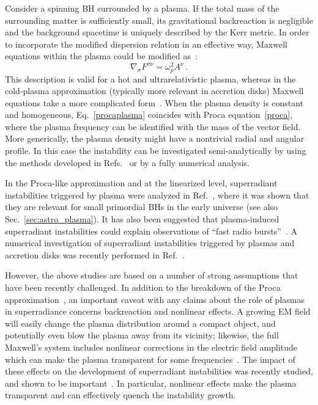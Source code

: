 \documentclass[11pt]{article}
\numberwithin{equation}{section} %
\begin{document}
Consider a spinning BH surrounded by a plasma. If the total mass of the surrounding matter is sufficiently small, its 
gravitational backreaction is negligible and the background spacetime is uniquely described by the Kerr metric.
In order to incorporate the modified dispersion relation in an effective way, Maxwell equations within the plasma could be modified as~\cite{Kulsrud:1991jt}:
\begin{equation}
\nabla_\sigma F^{\sigma\nu}=\omega_p^2 A^\nu\,.\label{procaplasma}
\end{equation}
This description is valid for a hot and ultrarelativistic plasma, whereas in the cold-plasma approximation (typically more relevant in accretion disks) Maxwell equations take a more complicated form~\cite{Cannizzaro:2020uap}.
%
When the plasma density is constant and homogeneous, Eq.~\eqref{procaplasma} coincides with Proca equation~\eqref{proca}, where the plasma frequency can be identified with the mass of the vector field. More generically, the plasma density might have a nontrivial radial and angular profile. In this case the instability can be investigated semi-analytically by using the methods developed in Refs.~\cite{Pani:2012vp,Pani:2013pma,Dima:2020rzg} or by a fully numerical analysis.

In the Proca-like approximation and at the linearized level, superradiant instabilities triggered by plasma were 
analyzed in Ref.~\cite{Pani:2013hpa}, where it was shown that they are relevant for small primordial BHs in the early 
universe (see also Sec.~\ref{sec:astro_plasma}). It has also been suggested that plasma-induced 
superradiant instabilities could explain observations of ``fast radio bursts''~\cite{Conlon:2017hhi}. A numerical 
investigation of superradiant instabilities triggered by plasmas and accretion disks was recently performed in 
Ref.~\cite{Dima:2020rzg}.


However, the above studies are based on a number of strong assumptions that have been recently challenged.
In addition to the breakdown of the Proca approximation~\cite{Cannizzaro:2020uap}, an important caveat with any claims 
about the role of plasmas in superradiance concerns backreaction and nonlinear effects. A growing EM field will easily 
change the plasma distribution around a compact object, and potentially even blow the plasma away from its vicinity; 
likewise, the full Maxwell's system includes nonlinear corrections in the electric field amplitude which can 
make the plasma transparent for some frequencies~\cite{1970PhFl...13..472K,1971PhRvL..27.1342M,Cardoso:2020nst}. 
The impact of these effects on the development of superradiant instabilities was recently studied, and shown to be important~\cite{Cardoso:2020nst}. In particular, nonlinear effects
make the plasma transparent and can effectively quench the instability growth.
\end{document}
